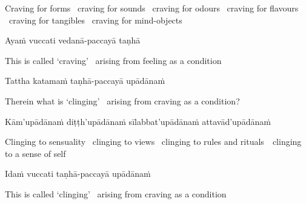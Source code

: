 \begin{english-hang}
  Craving for forms \breathmark\ craving for sounds \breathmark\ craving for odours \breathmark\ craving for flavours \breathmark\ craving for tangibles \breathmark\ craving for mind-objects
\end{english-hang}

Ayaṁ vuccati vedanā-paccayā taṇhā

\begin{english}
  This is called `craving' \breathmark\ arising from feeling as a condition
\end{english}

Tattha katamaṁ taṇhā-paccayā upādānaṁ

\begin{english}
  Therein what is `clinging' \breathmark\ arising from craving as a condition?
\end{english}

\begin{pali-hang}
  Kām'upādānaṁ diṭṭh'upādānaṁ sīlabbat'upādānaṁ attavād'upādānaṁ
\end{pali-hang}

\begin{english-hang}
  Clinging to sensuality \breathmark\ clinging to views \breathmark\ clinging to rules and \mbox{rituals}~\breathmark\ clinging to a sense of self\thinspace\makeatletter\hyperlink{endnote81-appendix}\makeatother
\end{english-hang}

Idaṁ vuccati taṇhā-paccayā upādānaṁ

\begin{english}
  This is called `clinging' \breathmark\ arising from craving as a condition
\end{english}

